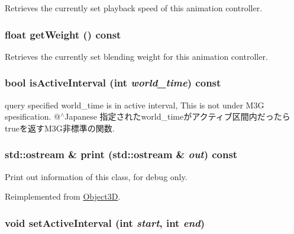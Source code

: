 Retrieves the currently set playback speed of this animation controller. \hypertarget{classm3g_1_1AnimationController_a17d38dafd3d75c59f0609f037fbe5ae}{
\subsubsection[{getWeight}]{\setlength{\rightskip}{0pt plus 5cm}float getWeight () const}}
\label{classm3g_1_1AnimationController_a17d38dafd3d75c59f0609f037fbe5ae}


Retrieves the currently set blending weight for this animation controller. \hypertarget{classm3g_1_1AnimationController_8db30a5f125f5b22a1cde9e41d93c2f0}{
\subsubsection[{isActiveInterval}]{\setlength{\rightskip}{0pt plus 5cm}bool isActiveInterval (int {\em world\_\-time}) const}}
\label{classm3g_1_1AnimationController_8db30a5f125f5b22a1cde9e41d93c2f0}


query specified world\_\-time is in active interval, This is not under M3G spesification. @$^\wedge$Japanese 指定されたworld\_\-timeがアクティブ区間内だったらtrueを返すM3G非標準の関数. \hypertarget{classm3g_1_1AnimationController_6fea17fa1532df3794f8cb39cb4f911f}{
\subsubsection[{print}]{\setlength{\rightskip}{0pt plus 5cm}std::ostream \& print (std::ostream \& {\em out}) const}}
\label{classm3g_1_1AnimationController_6fea17fa1532df3794f8cb39cb4f911f}


Print out information of this class, for debug only. 

Reimplemented from \hyperlink{classm3g_1_1Object3D_6fea17fa1532df3794f8cb39cb4f911f}{Object3D}.\hypertarget{classm3g_1_1AnimationController_a4cba877288d7a188477e0a756fd2f58}{
\subsubsection[{setActiveInterval}]{\setlength{\rightskip}{0pt plus 5cm}void setActiveInterval (int {\em start}, \/  int {\em end})}}
\label{classm3g_1_1AnimationController_a4cba877288d7a188477e0a756fd2f58}


